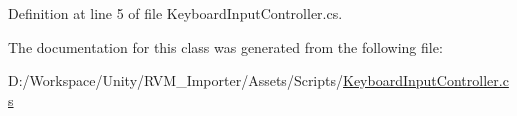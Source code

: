Definition at line 5 of file Keyboard\+Input\+Controller.\+cs.



The documentation for this class was generated from the following file\+:\begin{DoxyCompactItemize}
\item 
D\+:/\+Workspace/\+Unity/\+R\+V\+M\+\_\+\+Importer/\+Assets/\+Scripts/\mbox{\hyperlink{_keyboard_input_controller_8cs}{Keyboard\+Input\+Controller.\+cs}}\end{DoxyCompactItemize}
